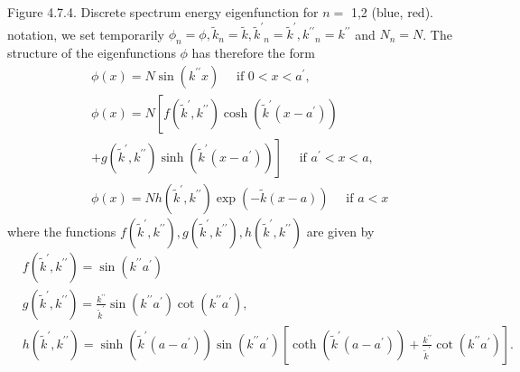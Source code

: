 \documentclass{article}
\begin{document}
Figure 4.7.4. Discrete spectrum energy eigenfunction for $n=$ 1,2 (blue, red).
notation, we set temporarily $\phi_{n}=\phi, \tilde{k}_{n}=\tilde{k}, \tilde{k}^{\prime}{ }_{n}=\tilde{k}^{\prime}, k^{\prime \prime}{ }_{n}=k^{\prime \prime}$ and $N_{n}=N$. The structure of the eigenfunctions $\phi$ has therefore the form
$$
\begin{align*}
& \phi(x)=N \sin \left(k^{\prime \prime} x\right) \quad \text { if } 0<x<a^{\prime},  \tag{4.7.44a}\\
& \phi(x)=N\left[f\left(\tilde{k}^{\prime}, k^{\prime \prime}\right) \cosh \left(\tilde{k}^{\prime}\left(x-a^{\prime}\right)\right)\right.  \tag{4.7.44b}\\
& \left.+g\left(\tilde{k}^{\prime}, k^{\prime \prime}\right) \sinh \left(\tilde{k}^{\prime}\left(x-a^{\prime}\right)\right)\right] \quad \text { if } a^{\prime}<x<a, \\
& \phi(x)=N h\left(\tilde{k}^{\prime}, k^{\prime \prime}\right) \exp (-\tilde{k}(x-a)) \quad \text { if } a<x \tag{4.7.44c}
\end{align*}
$$
where the functions $f\left(\tilde{k}^{\prime}, k^{\prime \prime}\right), g\left(\tilde{k}^{\prime}, k^{\prime \prime}\right), h\left(\tilde{k}^{\prime}, k^{\prime \prime}\right)$ are given by
$$
\begin{align*}
& f\left(\tilde{k}^{\prime}, k^{\prime \prime}\right)=\sin \left(k^{\prime \prime} a^{\prime}\right)  \tag{4.7.45a}\\
& g\left(\tilde{k}^{\prime}, k^{\prime \prime}\right)=\frac{k^{\prime \prime}}{\tilde{k}^{\prime}} \sin \left(k^{\prime \prime} a^{\prime}\right) \cot \left(k^{\prime \prime} a^{\prime}\right),  \tag{4.7.45b}\\
& h\left(\tilde{k}^{\prime}, k^{\prime \prime}\right)=\sinh \left(\tilde{k}^{\prime}\left(a-a^{\prime}\right)\right) \sin \left(k^{\prime \prime} a^{\prime}\right)\left[\operatorname{coth}\left(\tilde{k}^{\prime}\left(a-a^{\prime}\right)\right)+\frac{k^{\prime \prime}}{\tilde{k}^{\prime}} \cot \left(k^{\prime \prime} a^{\prime}\right)\right] . \tag{4.7.45c}
\end{align*}
$$
\end{document}
